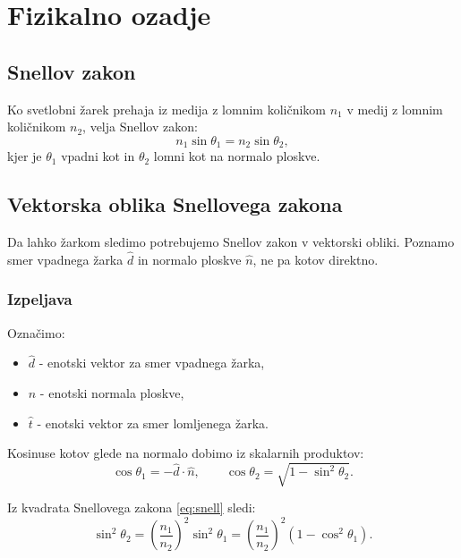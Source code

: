 \documentclass[a4paper,12pt]{article}
\begin{document}
    \section{Fizikalno ozadje}

    \subsection{Snellov zakon}

    Ko svetlobni žarek prehaja iz medija z lomnim količnikom $n_1$ v medij z lomnim količnikom
    $n_2$, velja Snellov zakon:
    \begin{equation}
        n_1 \sin\theta_1 = n_2 \sin\theta_2,
        \label{eq:snell}
    \end{equation}
    kjer je $\theta_1$ vpadni kot in $\theta_2$ lomni kot na normalo ploskve.

    \subsection{Vektorska oblika Snellovega zakona}

    Da lahko žarkom sledimo potrebujemo Snellov zakon v vektorski obliki.
    Poznamo smer vpadnega žarka $\hat{d}$ in normalo ploskve $\hat{n}$, ne pa kotov direktno.

    \subsubsection{Izpeljava}

    Označimo:
    \begin{itemize}
        \item $\hat{d}$ - enotski vektor za smer vpadnega žarka,
        \item $\hat{n}$ - enotski normala ploskve,
        \item $\hat{t}$ - enotski vektor za smer lomljenega žarka.
    \end{itemize}

    Kosinuse kotov glede na normalo dobimo iz skalarnih produktov:
    \begin{equation}
        \cos\theta_1 = -\hat{d} \cdot \hat{n}, \qquad \cos\theta_2 = \sqrt{1 - \sin^2\theta_2}.
    \end{equation}

    Iz kvadrata Snellovega zakona \eqref{eq:snell} sledi:
    \begin{equation}
        \sin^2\theta_2 = \left(\frac{n_1}{n_2}\right)^2 \sin^2\theta_1
        = \left(\frac{n_1}{n_2}\right)^2 (1 - \cos^2\theta_1).
    \end{equation}
\end{document}
